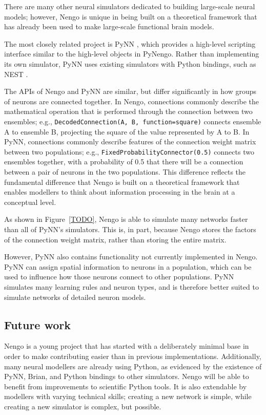\documentclass{frontiersSCNS}
\begin{document}
There are many other neural simulators
dedicated to building large-scale neural models;
however, Nengo is unique in being built
on a theoretical framework
that has already been used to make
large-scale functional brain models.

The most closely related project is PyNN
\cite{TODO},
which provides a high-level scripting
interface similar to the
high-level objects in PyNengo.
Rather than implementing its
own simulator, PyNN uses existing
simulators with Python bindings,
such as NEST \cite{TODO}.

The APIs of Nengo and PyNN are similar,
but differ significantly
in how groups of neurons are connected together.
In Nengo, connections commonly describe
the mathematical operation that is performed
through the connection between
two ensembles;
e.g., \texttt{DecodedConnection(A, B,
function=square)} connects ensemble A
to ensemble B, projecting the square of
the value represented by A to B.
In PyNN, connections commonly describe
features of the connection weight matrix
between two populations;
e.g., \texttt{FixedProbabilityConnector(0.5)}
connects two ensembles together,
with a probability of 0.5
that there will be a connection
between a pair of neurons in the two populations.
This difference reflects the
fundamental difference that Nengo
is built on a theoretical framework
that enables modellers to think
about information processing in the brain
at a conceptual level.

As shown in Figure~\ref{TODO},
Nengo is able to simulate many networks
faster than all of PyNN's simulators.
This is, in part,
because Nengo stores the factors
of the connection weight matrix,
rather than storing the entire matrix.

However, PyNN also contains functionality
not currently implemented in Nengo.
PyNN can assign spatial information
to neurons in a population,
which can be used to influence
how those neurons connect to other populations.
PyNN simulates many learning rules
and neuron types,
and is therefore better suited to
simulate networks of detailed neuron models.

\subsection{Future work}

Nengo is a young project that
has started with a deliberately minimal base
in order to make contributing easier than in
previous implementations.
Additionally, many neural modellers
are already using Python,
as evidenced by the existence of
PyNN, Brian, and Python bindings to other simulators.
Nengo will be able to benefit
from improvements to scientific Python tools.
It is also extendable by modellers with
varying technical skills;
creating a new network is simple,
while creating a new simulator is complex, but possible.
\end{document}
